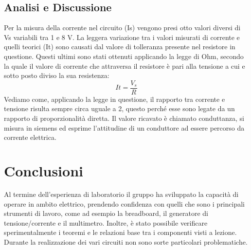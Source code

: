 \subsection{Analisi e Discussione}
Per la misura della corrente nel circuito (Is) vengono presi otto valori diversi di Vs variabili tra 1 e 8 V. La leggera variazione tra i valori misurati di corrente e quelli teorici (It) sono causati dal valore di tolleranza presente nel resistore in questione. Questi ultimi sono stati ottenuti applicando la legge di Ohm, secondo la quale il valore di corrente che attraversa il resistore è pari alla tensione a cui e sotto posto diviso la sua resistenza:
\[
    It=\frac{V_s}{R}
\]
Vediamo come, applicando la legge in questione, il rapporto tra corrente e tensione risulta sempre circa uguale a 2, questo perché esse sono legate da un rapporto di proporzionalità diretta. Il valore ricavato è chiamato conduttanza, si misura in siemens ed esprime l’attitudine di un conduttore ad essere percorso da corrente elettrica. 
\section{Conclusioni}
Al termine dell’esperienza di laboratorio il gruppo ha sviluppato la capacità di operare in ambito elettrico, prendendo confidenza con quelli che sono i principali strumenti di lavoro, come ad esempio la breadboard, il generatore di tensione/corrente e il multimetro. Inoltre, è stato possibile verificare sperimentalmente i teoremi e le relazioni base tra i componenti visti a lezione. Durante la realizzazione dei vari circuiti non sono sorte particolari problematiche.

